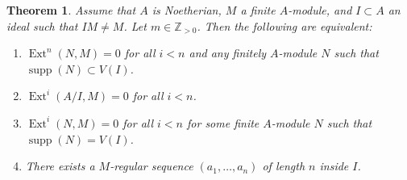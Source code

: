 \documentclass[leqno, openany]{memoir}
\newtheorem{thm}{Theorem}[section]
\theoremstyle{definition}
\theoremstyle{remark}
\theoremstyle{plain}
\theoremstyle{definition}
\theoremstyle{remark}
\newcommand{\Z}{\mathbb{Z}}
\DeclareMathOperator{\supp}{supp}
\DeclareMathOperator{\Ext}{Ext}
\begin{document}
\begin{thm} \label{thm:depth} Assume that $A$ is Noetherian, $M$ a finite
    $A$-module, and $I \subset A$ an ideal such that $IM \neq M$. Let $m \in
    \Z_{>0}$. Then the following are equivalent: \begin{enumerate} \item
        $\Ext^n(N,M) = 0$ for all $i < n$ and any finitely $A$-module $N$ such
        that $\supp(N) \subset V(I)$.  \item $\Ext^i(A/I,M) = 0$ for all $i <
        n$.  \item $\Ext^i(N,M) = 0$ for all $i < n$ for some finite $A$-module
        $N$ such that $\supp(N) = V(I)$.  \item There exists a $M$-regular
        sequence $(a_1, \ldots, a_n)$ of length $n$ inside $I$.
\end{enumerate} \end{thm}
\end{document}
